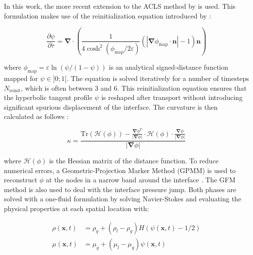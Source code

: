 In this work, the more recent extension to the ACLS method by  is used. This formulation makes use of the reinitialization equation introduced by :

\begin{equation}
\label{eq:acls_reinit_2017}
\frac{\partial\psi}{\partial \tau}=\boldsymbol{\nabla}\cdot\left(\frac{1}{4\cosh^2{\left(\phi_{\mathrm{map}}/2\varepsilon\right)}}\left(|\boldsymbol{\nabla}\phi_{\mathrm{map}}\cdot\textbf{n}|-1\right)\textbf{n}\right)
\end{equation}

where $\phi_{\mathrm{map}}=\varepsilon\ln\left({\psi}/({1-\psi})\right)$ is an analytical signed-distance function mapped for $\psi \in ]0;1[$. The equation is solved iteratively for a number of timesteps $N_\mathrm{reinit}$, which is often between 3 and 6. This reinitialization equation ensures that the hyperbolic tangent profile $\psi$ is reshaped after transport without introducing significant spurious displacement of the interface. The curvature is then calculated as follows :

\begin{equation}
\kappa=\frac{\mathrm{Tr}\left(\boldsymbol{\mathcal{H}}(\phi)\right)-\frac{\boldsymbol{\nabla}\phi^T}{|\boldsymbol{\nabla}\phi|}\cdot\boldsymbol{\mathcal{H}}\left(\phi\right)\cdot\frac{\boldsymbol{\nabla}\phi}{|\boldsymbol{\nabla}\phi|}}{|\boldsymbol{\nabla}\phi|}
\label{eq:curvature_Goldman}
\end{equation}

where $\mathcal{H} \left( \phi \right)$ is the Hessian matrix of the distance function. To reduce numerical errors, a Geometric-Projection Marker Method (GPMM) is used to reconstruct $\phi$ at the nodes in a narrow band around the interface . The GFM method is also used to deal with the interface pressure jump. Both phases are solved with a one-fluid formulation by solving Navier-Stokes and evaluating the physical properties at each spatial location with:

\begin{subequations}
\begin{align}
\rho(\textbf{x},t) &= \rho_g+(\rho_l-\rho_g)H(\psi(\textbf{x},t)-1/2)  \\
\mu(\textbf{x},t) &= \mu_g+(\mu_l-\mu_g)\psi(\textbf{x},t)
\end{align}
\end{subequations}

